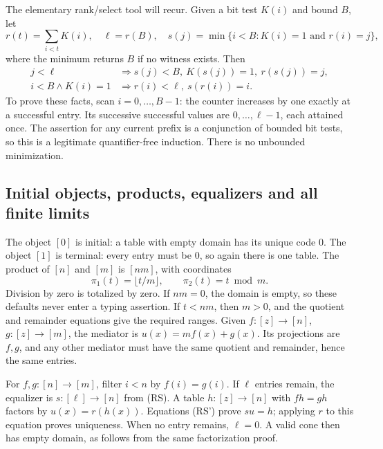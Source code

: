 The elementary rank/select tool will recur. Given a bit test $K(i)$ and
bound $B$, let
\[
 r(t)=\sum_{i<t}K(i),\quad \ell=r(B),\quad
 s(j)=\min\{i<B:K(i)=1\text{ and }r(i)=j\},                  \tag{RS}
\]
where the minimum returns $B$ if no witness exists. Then
\[
 \begin{split}
 j<\ell&\Rightarrow s(j)<B,\ K(s(j))=1,\ r(s(j))=j,\\
 i<B\wedge K(i)=1&\Rightarrow r(i)<\ell,\ s(r(i))=i.
 \end{split}                                               \tag{RS'}
\]
To prove these facts, scan $i=0,\ldots,B-1$: the counter increases by one
exactly at a successful entry. Its successive successful values are
$0,\ldots,\ell-1$, each attained once. The assertion for any current
prefix is a conjunction of bounded bit tests, so this is a legitimate
quantifier-free induction. There is no unbounded minimization.

\subsection{Initial objects, products, equalizers and all finite limits}
The object $[0]$ is initial: a table with empty domain has its unique code
$0$. The object $[1]$ is terminal: every entry must be $0$, so again there
is one table. The product of $[n]$ and $[m]$ is $[nm]$, with coordinates
\[
 \pi_1(t)=\lfloor t/m\rfloor,\qquad \pi_2(t)=t\bmod m.
\]
Division by zero is totalized by zero. If $nm=0$, the domain is empty, so
these defaults never enter a typing assertion. If $t<nm$, then $m>0$,
and the quotient and remainder equations give the required ranges.
Given $f:[z]\to[n]$, $g:[z]\to[m]$, the mediator is
$u(x)=m f(x)+g(x)$. Its projections are $f,g$, and any other mediator
must have the same quotient and remainder, hence the same entries.

For $f,g:[n]\to[m]$, filter $i<n$ by $f(i)=g(i)$. If $\ell$ entries
remain, the equalizer is $s:[\ell]\to[n]$ from (RS). A table
$h:[z]\to[n]$ with $fh=gh$ factors by $u(x)=r(h(x))$.
Equations (RS') prove $su=h$; applying $r$ to this equation proves
uniqueness. When no entry remains, $\ell=0$. A valid cone then has empty
domain, as follows from the same factorization proof.

